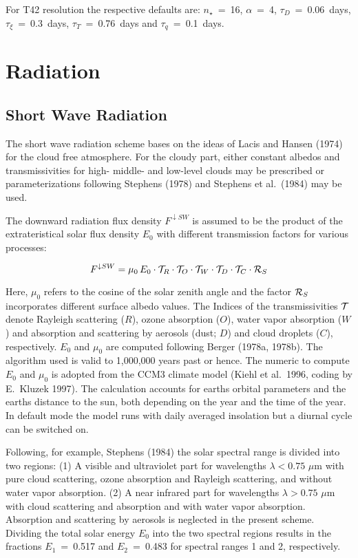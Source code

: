 For T42 resolution the respective defaults are:
$n_{\star}$~=~16, $\alpha$~=~4,
$\tau_D$~=~0.06~days,
$\tau_{\xi}$~=~0.3~days, $\tau_T$~=~0.76~days and $\tau_q$~=~0.1~days.
 


\newpage

\section{Radiation}

\subsection{Short Wave Radiation}

The short wave radiation scheme bases
on the ideas of Lacis and Hansen (1974) for the cloud
free
atmosphere. For the cloudy part, either constant
albedos and
transmissivities for high- middle- and low-level clouds
may be prescribed  or parameterizations
following Stephens (1978) and Stephens et al.~(1984)
may be used. 

The downward radiation flux density
$F^{\downarrow SW}$ is assumed to be the
product of the extrateristical solar flux density
$E_0$ with different transmission factors for various
processes:

\begin{equation}
F^{\downarrow SW}= \mu_0 \, E_0 \cdot {\cal T}_R \cdot {\cal T}_O
\cdot {\cal T}_W \cdot {\cal T}_D \cdot
{\cal T}_C \cdot
{\cal R}_S
\end{equation}

Here, $\mu_0$ refers to the cosine of the solar zenith
angle and the factor ${\cal R}_S$ incorporates
different surface
albedo values. The Indices of the transmissivities ${\cal T}$
denote Rayleigh scattering ($R$), ozone
absorption ($O$), water vapor absorption ($W$) and
absorption and scattering by aerosols
(dust; $D$) and cloud droplets ($C$), respectively. 
$E_0$  and $\mu_0$ are computed following 
Berger (1978a, 1978b). The algorithm used is valid to
1,000,000 years past or hence. The numeric to compute
$E_0$ and
$\mu_0$ is adopted from the
CCM3 climate model (Kiehl et al.~1996, coding by E.~Kluzek 1997).
The
calculation accounts
for earths orbital parameters and the earths distance
to the sun, both depending on the year and the time
of the year. In default mode the model runs with daily averaged insolation but a diurnal cycle can be switched on.

Following, for example, Stephens (1984) the solar
spectral range
is divided into two regions: (1) A visible and
ultraviolet
part for wavelengths $\lambda < 0.75$ $\mu$m with
pure cloud
scattering, ozone absorption and
Rayleigh scattering, and without water vapor
absorption. (2) A
near infrared part  for
wavelengths $\lambda >  0.75$ $\mu$m with cloud
scattering and
absorption and with water vapor absorption.  Absorption
and
scattering by aerosols is neglected in the present
scheme. Dividing
the total solar energy $E_0$ into the two spectral
regions results in the
fractions ${E_1}$~=~0.517 and $E_2$~=~0.483 for
spectral
ranges 1 and 2, respectively.


